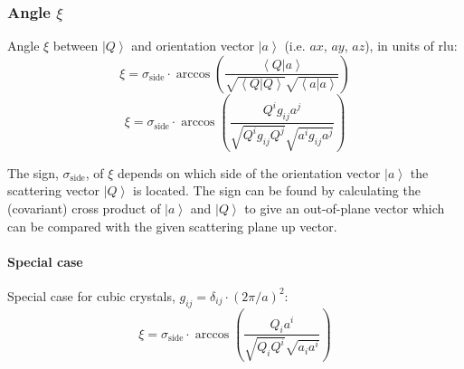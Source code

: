 \documentclass{article}
\begin{document}
\subsubsection*{Angle $\xi$}
Angle $\xi$ between $\left| Q \right>$ and orientation vector $\left| a \right>$ (i.e. $ax$, $ay$, $az$), in units of rlu:
\begin{equation} \xi = \sigma_{\mathrm{side}} \cdot \arccos \left( \frac{ \left< Q | a \right> }{ \sqrt{\left< Q | Q \right>} \sqrt{\left< a | a \right>} } \right) \end{equation}
\begin{equation} \boxed{ \xi = \sigma_{\mathrm{side}} \cdot \arccos \left( \frac{ Q^i g_{ij} a^j }{ \sqrt{Q^i g_{ij} Q^j} \sqrt{a^i g_{ij} a^j} } \right) } \end{equation}

The sign, $\sigma_{\mathrm{side}}$, of $\xi$ depends on which side of the orientation vector $\left| a \right>$ the scattering vector $\left| Q \right>$ is located. The sign can be found by calculating the (covariant) cross product of $\left| a \right>$ and $\left| Q \right>$ to give an out-of-plane vector which can be compared with the given scattering plane up vector.


\paragraph*{Special case}
Special case for cubic crystals, $g_{ij} = \delta_{ij} \cdot \left( 2\pi / a \right)^2$:
\begin{equation} \xi = \sigma_{\mathrm{side}} \cdot \arccos \left( \frac{ Q_i a^i }{ \sqrt{Q_i Q^i} \sqrt{a_i a^i} } \right) \end{equation}
\end{document}
